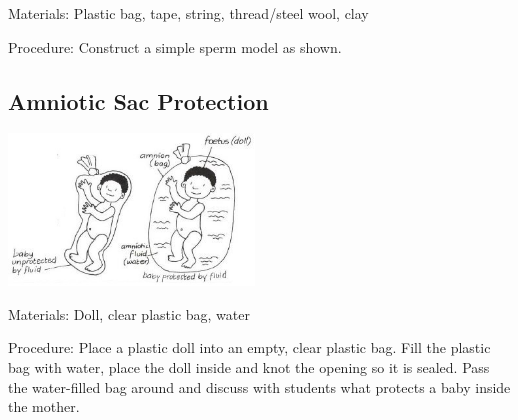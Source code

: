 \begin{multicols}{2}
\begin{description*}
\item[Materials:]{Plastic bag, tape, string, thread/steel wool, clay}
\item[Procedure:]{Construct a simple sperm model as shown.}
\end{description*}

\subsection{Amniotic Sac Protection}

\begin{center}
\includegraphics[width=0.49\textwidth]{./img/vso/amniotic-sac.jpg}
\end{center}

\begin{description*}
\item[Materials:]{Doll, clear plastic bag, water}
\item[Procedure:]{Place a plastic doll into an empty,
clear plastic bag. Fill the plastic
bag with water, place the doll
inside and knot the opening so it
is sealed. Pass the water-filled bag
around and discuss with students
what protects a baby inside the
mother.}
\end{description*}


\end{multicols}
